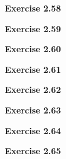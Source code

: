 \documentclass{article}
\begin{document}
\bigskip

\begin{framed}
    \noindent \textbf{Exercise 2.58}
    
    \medskip
    
    
\end{framed}

\bigskip

\begin{framed}
    \noindent \textbf{Exercise 2.59}
    
    \medskip
    
    
\end{framed}

\bigskip

\begin{framed}
    \noindent \textbf{Exercise 2.60}
    
    \medskip
    
    
\end{framed}

\bigskip

\begin{framed}
    \noindent \textbf{Exercise 2.61}
    
    \medskip
    
    
\end{framed}

\bigskip

\begin{framed}
    \noindent \textbf{Exercise 2.62}
    
    \medskip
    
    
\end{framed}

\bigskip

\begin{framed}
    \noindent \textbf{Exercise 2.63}
    
    \medskip
    
    
\end{framed}

\bigskip

\begin{framed}
    \noindent \textbf{Exercise 2.64}
    
    \medskip
    
    
\end{framed}

\bigskip

\begin{framed}
    \noindent \textbf{Exercise 2.65}
    
    \medskip
    
    
\end{framed}
\end{document}
